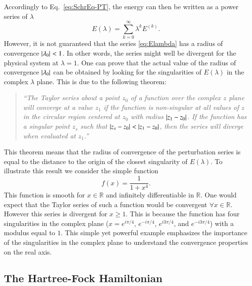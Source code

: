 \documentclass[aps,prb,reprint,noshowkeys,superscriptaddress]{revtex4-1}
\begin{document}
Accordingly to Eq.~\eqref{eq:SchrEq-PT}, the energy can then be written as a power series of $\lambda$
\begin{equation} \label{eq:Elambda}
	E(\lambda) = \sum_{k=0}^\infty \lambda^k E^{(k)}.
\end{equation}
However, it is not guaranteed that the series \eqref{eq:Elambda} has a radius of convergence $\abs{\lambda_0} < 1$. 
In other words, the series might well be divergent for the physical system at $\lambda = 1$. 
One can prove that the actual value of the radius of convergence $\abs{\lambda_0}$ can be obtained by looking for the singularities of $E(\lambda)$ in the complex $\lambda$ plane.
This is due to the following theorem: \cite{Goodson_2012}
\begin{quote}
	\textit{``The Taylor series about a point $z_0$ of a function over the complex $z$ plane will converge at a value $z_1$ if the function is non-singular at all values of $z$ in the circular region centered at $z_0$ with radius $\abs{z_1-z_0}$. If the function has a singular point $z_s$ such that $\abs{z_s-z_0} < \abs{z_1-z_0}$, then the series will diverge when evaluated at $z_1$.''}
\end{quote}
This theorem means that the radius of convergence of the perturbation series is equal to the distance to the origin of the closest singularity of $E(\lambda)$. To illustrate this result we consider the simple function \cite{BenderBook}
\begin{equation} \label{eq:DivExample}
	f(x)=\frac{1}{1+x^4}.
\end{equation}
This function is smooth for $x \in \mathbb{R}$ and infinitely differentiable in $\mathbb{R}$. One would expect that the Taylor series of such a function would be convergent $\forall x \in \mathbb{R}$. However this series is divergent for $x \ge 1$. This is because the function has four singularities in the complex plane ($x = e^{i\pi/4}$, $e^{-i\pi/4}$, $e^{i3\pi/4}$, and $e^{-i3\pi/4}$) with a modulus equal to $1$. This simple yet powerful example emphasizes the importance of the singularities in the complex plane to understand the convergence properties on the real axis.

\subsection{The Hartree-Fock Hamiltonian}
\end{document}
